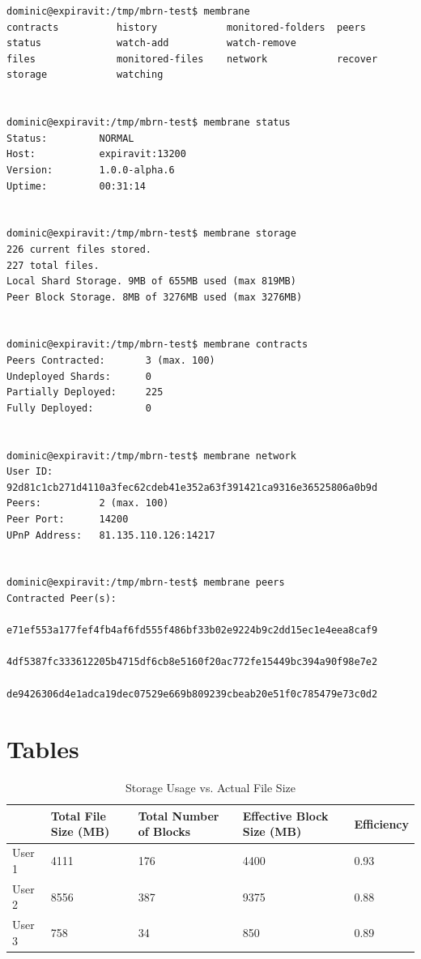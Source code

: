 \documentclass[11pt, a4paper, twoside]{report}
\begin{document}
\begin{lstlisting}[language=RsT, caption=CLI Usage Example, label=lst:cli-status]
dominic@expiravit:/tmp/mbrn-test$ membrane 
contracts          history            monitored-folders  peers              status             watch-add          watch-remove
files              monitored-files    network            recover            storage            watching           


dominic@expiravit:/tmp/mbrn-test$ membrane status 
Status:         NORMAL
Host:           expiravit:13200
Version:        1.0.0-alpha.6
Uptime:         00:31:14


dominic@expiravit:/tmp/mbrn-test$ membrane storage 
226 current files stored.
227 total files.
Local Shard Storage. 9MB of 655MB used (max 819MB)
Peer Block Storage. 8MB of 3276MB used (max 3276MB)


dominic@expiravit:/tmp/mbrn-test$ membrane contracts 
Peers Contracted:       3 (max. 100)
Undeployed Shards:      0
Partially Deployed:     225
Fully Deployed:         0


dominic@expiravit:/tmp/mbrn-test$ membrane network 
User ID:        92d81c1cb271d4110a3fec62cdeb41e352a63f391421ca9316e36525806a0b9d
Peers:          2 (max. 100)
Peer Port:      14200
UPnP Address:   81.135.110.126:14217


dominic@expiravit:/tmp/mbrn-test$ membrane peers 
Contracted Peer(s):
        e71ef553a177fef4fb4af6fd555f486bf33b02e9224b9c2dd15ec1e4eea8caf9
        4df5387fc333612205b4715df6cb8e5160f20ac772fe15449bc394a90f98e7e2
        de9426306d4e1adca19dec07529e669b809239cbeab20e51f0c785479e73c0d2
\end{lstlisting}

\section{Tables}

\begin{table}[h!]
\centering
\label{tab:storageUsage}
\begin{tabular}{|l|l|l|l|l|}
\hline
       & Total File Size (MB) & Total Number of Blocks & Effective Block Size (MB) & Efficiency \\ \hline
User 1 & 4111                 & 176                    & 4400                      & 0.93       \\ \hline
User 2 & 8556                 & 387                    & 9375                      & 0.88       \\ \hline
User 3 & 758                  & 34                     & 850                       & 0.89       \\ \hline
\end{tabular}
\caption{Storage Usage vs. Actual File Size}
\end{table}
\end{document}
